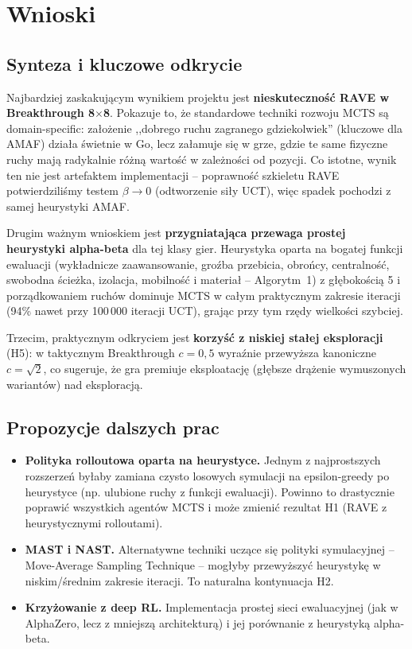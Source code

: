 \section{Wnioski}
\label{sec:wnioski}

\subsection{Synteza i kluczowe odkrycie}

Najbardziej zaskakującym wynikiem projektu jest \textbf{nieskuteczność
RAVE w Breakthrough 8$\times$8}. Pokazuje to, że standardowe techniki rozwoju
MCTS są domain-specific: założenie ,,dobrego ruchu zagranego gdziekolwiek''
(kluczowe dla AMAF) działa świetnie w Go, lecz załamuje się w grze, gdzie
te same fizyczne ruchy mają radykalnie różną wartość w zależności od pozycji.
Co istotne, wynik ten nie jest artefaktem implementacji -- poprawność szkieletu
RAVE potwierdziliśmy testem $\beta \to 0$ (odtworzenie siły UCT), więc spadek
pochodzi z samej heurystyki AMAF.

Drugim ważnym wnioskiem jest \textbf{przygniatająca przewaga prostej heurystyki
alpha-beta} dla tej klasy gier. Heurystyka oparta na bogatej funkcji ewaluacji
(wykładnicze zaawansowanie, groźba przebicia, obrońcy, centralność, swobodna
ścieżka, izolacja, mobilność i materiał -- Algorytm~1) z głębokością 5 i
porządkowaniem ruchów dominuje MCTS w całym praktycznym zakresie iteracji
(94\% nawet przy 100\,000 iteracji UCT), grając przy tym rzędy wielkości szybciej.

Trzecim, praktycznym odkryciem jest \textbf{korzyść z niskiej stałej eksploracji}
(H5): w taktycznym Breakthrough $c = 0{,}5$ wyraźnie przewyższa kanoniczne
$c = \sqrt{2}$, co sugeruje, że gra premiuje eksploatację (głębsze drążenie
wymuszonych wariantów) nad eksploracją.

\subsection{Propozycje dalszych prac}

\begin{itemize}[nosep]
    \item \textbf{Polityka rolloutowa oparta na heurystyce.} Jednym z najprostszych
          rozszerzeń byłaby zamiana czysto losowych symulacji na epsilon-greedy
          po heurystyce (np. ulubione ruchy z funkcji ewaluacji). Powinno to
          drastycznie poprawić wszystkich agentów MCTS i może zmienić
          rezultat H1 (RAVE z heurystycznymi rolloutami).
    \item \textbf{MAST i NAST.} Alternatywne techniki uczące się polityki
          symulacyjnej -- Move-Average Sampling Technique \cite{finnsson2008simulation}
          -- mogłyby przewyższyć heurystykę w niskim/średnim zakresie
          iteracji. To naturalna kontynuacja H2.
    \item \textbf{Krzyżowanie z deep RL.} Implementacja prostej sieci ewaluacyjnej
          (jak w AlphaZero, lecz z mniejszą architekturą) i jej porównanie
          z heurystyką alpha-beta.
\end{itemize}
